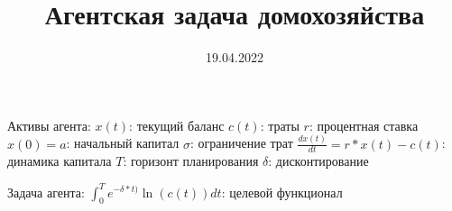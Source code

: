 \documentclass{a_model}
\title{Агентская задача домохозяйства}
\date{19.04.2022}
\begin{document}
Активы агента:
    $x(t)$: текущий баланс
    $c(t)$: траты
    $r$: процентная ставка
    $x(0)=a$: начальный капитал
    $\sigma$: ограничение трат
    $\frac{dx(t)}{dt} = r*x(t)-c(t)$: динамика капитала
    $T$: горизонт планирования
    $\delta$: дисконтирование

Задача агента:
    $\int_0^T e^{-\delta*t)} \ln(c(t))dt$: целевой функционал
\end{document}
